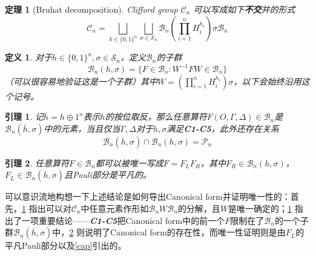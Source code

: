 \documentclass[8pt]{article}
\newtheorem{theorem}{定理}
\newtheorem{lemma}{引理}
\newtheorem{definition}{定义}
\begin{document}
\begin{theorem}[Bruhat decomposition]
	Clifford group $\mathcal C_n$ 可以写成如下\textbf{不交}并的形式
	\begin{equation}
		\mathcal C_n = \bigsqcup_{h \in \{0, 1\}^n}\bigsqcup_{\sigma \in \mathcal S_n} \mathcal B_n\left(\prod_{i=1}^{n}H_i^{h_i}\right)\sigma\mathcal B_n
	\end{equation}
	\label{brh}
\end{theorem}
\begin{definition}
	对于$h \in \{0, 1\}^n, \sigma \in \mathcal S_n$，定义$\mathcal B_n$的子群
	\begin{equation}
	\mathcal B_n(h, \sigma) = \{F \in \mathcal B_n: W^{-1}FW \in \mathcal B_n\}
	\end{equation}
	（可以很容易地验证这是一个子群）其中$W = \left(\prod\limits_{i=1}^{n}H_i^{h_i}\right)\sigma$，以下会始终沿用这个记号。
\end{definition}
\begin{lemma}
	记$\overline{h} = h \oplus 1^n$表示$h$的按位取反，那么任意算符$F(O, \Gamma, \Delta) \in \mathcal B_n$是$\mathcal B_n(\overline{h}, \sigma)$中的元素，当且仅当$\Gamma, \Delta$对于$h, \sigma$满足\textbf{\textit{C1-C5}}，此外还存在关系\begin{equation}
	\mathcal B_n(\overline{h}, \sigma) \cap \mathcal B_n(h, \sigma) = \mathcal P_n
	\label{cap}
	\end{equation}
	\label{lemma2-1}
\end{lemma}
\begin{lemma}
	任意算符$F \in \mathcal B_n$都可以被唯一写成$F = F_LF_R$，其中$F_R \in \mathcal B_n(h, \sigma)$，$F_L \in \mathcal B_n(\overline{h}, \sigma)$且Pauli部分是平凡的。
	\label{lemma2-2}
\end{lemma}

可以意识流地构想一下上述结论是如何导出Canonical form并证明唯一性的：首先，\cref{brh} 指出可以对$\mathcal C_n$中任意元素作形如$\mathcal B_n W \mathcal B_n$的分解，且$W$是唯一确定的；\cref{lemma2-1} 指出了一项重要结论——\textbf{\textit{C1-C5}}把Canonical form中的前一个$F$限制在了$\mathcal B_n$的一个子群$\mathcal B_n(\overline h, \sigma)$中，\cref{lemma2-2} 则说明了Canonical form的存在性，而唯一性证明则是由$F_L$的平凡Pauli部分以及\cref{cap}引出的。
\end{document}
